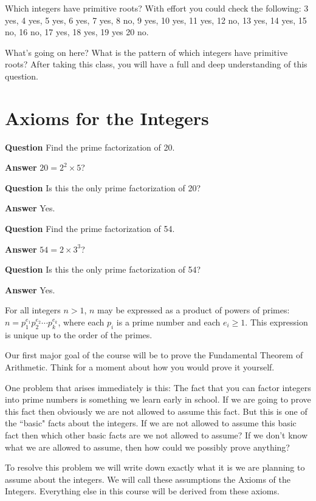 \documentclass[oneside,12pt]{amsart}
\begin{document}
Which integers have primitive roots? With effort you could check the following:
3 yes, 4 yes, 5 yes, 6 yes, 7 yes, 8 no, 9 yes, 10 yes, 11 yes, 12 no, 13 yes, 14 yes, 15 no,
16 no, 17 yes, 18 yes, 19 yes 20 no.

What's going on here? What is the pattern of which integers have primitive roots? After taking
 this
class, you will have a full and deep understanding of this question.

\newpage

\section{Axioms for the Integers}

\textbf{Question} Find the prime factorization of 20.

\textbf{Answer} $20=2^2 \times 5$?

\textbf{Question} Is this the only prime factorization of 20?

\textbf{Answer} Yes.

\textbf{Question} Find the prime factorization of 54.

\textbf{Answer} $54=2\times 3^3$?

\textbf{Question} Is this the only prime factorization of 54?

\textbf{Answer} Yes.

\begin{theorem} For all integers $n>1$, $n$ may be expressed
as a product of powers of primes: $n=p_1^{e_1}p_2^{e_2}\cdots p_k^{e_k}$, where each
$p_i$ is a prime number and each $e_i\geq 1$. This expression is unique up to the order of
the primes.
\end{theorem}

Our first major goal of the course will be to prove the Fundamental Theorem of Arithmetic. Think
for a moment about how you would prove it yourself.

One problem that arises immediately is this: The fact that you can factor integers into prime numbers is something we learn
early in school. If we are going to prove this fact then obviously we are not allowed to assume this fact. But this is
one of the ``basic" facts about the integers. If we are not allowed to assume this basic fact then which other basic facts
are we not allowed to assume? If we don't know what we are allowed to assume, then how could we possibly prove anything?

To resolve this problem we will write down exactly what it is we are planning to assume about the integers. We will call these assumptions the Axioms of the Integers. Everything else in
this course will be derived from these axioms.
\end{document}
